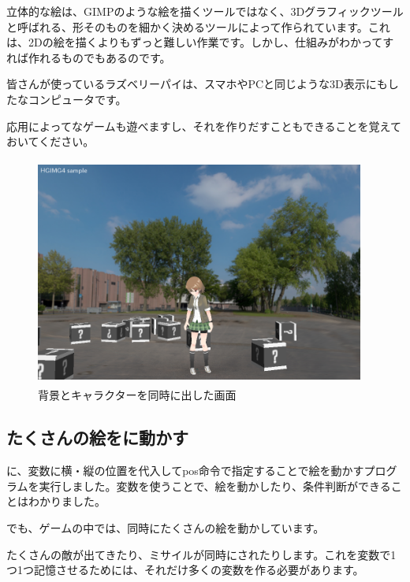 立体的な絵は、GIMPのような絵を描くツールではなく、3Dグラフィックツールと呼ばれる、形そのものを細かく決めるツールによって作られています。これは、2Dの絵を描くよりもずっと難しい作業です。しかし、仕組みがわかってすれば作れるものでもあるのです。


皆さんが使っているラズベリーパイは、スマホやPCと同じような3D表示にもしたなコンピュータです。

応用によってなゲームも遊べますし、それを作りだすこともできることを覚えておいてください。


\begin{figure}[H]
    \begin{center}
      \includegraphics[keepaspectratio,width=10.834cm,height=7.514cm]{text04-img/s_pronamabox.png}
      \caption{背景とキャラクターを同時に出した画面}
    \end{center}
    \label{fig:prog_menu}
\end{figure}

\newpage
\subsection{たくさんの絵をに動かす}

に、変数に横・縦の位置を代入してpos命令で指定することで絵を動かすプログラムを実行しました。変数を使うことで、絵を動かしたり、条件判断ができることはわかりました。

でも、ゲームの中では、同時にたくさんの絵を動かしています。

たくさんの敵が出てきたり、ミサイルが同時にされたりします。これを変数で1つ1つ記憶させるためには、それだけ多くの変数を作る必要があります。

